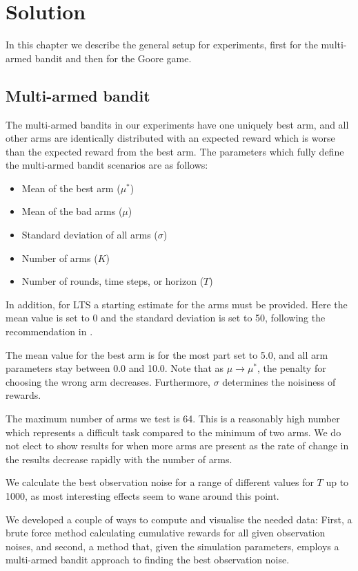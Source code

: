 \chapter{Solution}
\label{ch:solution}

In this chapter we describe the general setup for experiments, first for the multi-armed bandit and then for the Goore game.

\section{Multi-armed bandit}
The multi-armed bandits in our experiments have one uniquely best arm, and all other arms are identically distributed with an expected reward which is worse than the expected reward from the best arm.
The parameters which fully define the multi-armed bandit scenarios are as follows:
\begin{itemize}
    \item Mean of the best arm ($\mu^*$)
    \item Mean of the bad arms ($\mu$)
    \item Standard deviation of all arms ($\sigma$)
    \item Number of arms ($K$)
    \item Number of rounds, time steps, or horizon ($T$)
\end{itemize}

In addition, for LTS a starting estimate for the arms must be provided.
Here the mean value is set to 0 and the standard deviation is set to 50, following the recommendation in \cite{Glimsdal12}.

The mean value for the best arm is for the most part set to 5.0, and all arm parameters stay between 0.0 and 10.0.
Note that as $\mu \to \mu^*$, the penalty for choosing the wrong arm decreases.
Furthermore, $\sigma$ determines the noisiness of rewards.

The maximum number of arms we test is 64.
This is a reasonably high number which represents a difficult task compared to the minimum of two arms.
We do not elect to show results for when more arms are present as the rate of change in the results decrease rapidly with the number of arms.

We calculate the best observation noise for a range of different values for $T$ up to 1000, as most interesting effects seem to wane around this point.

We developed a couple of ways to compute and visualise the needed data:
First, a brute force method calculating cumulative rewards for all given observation noises, and second, a method that, given the simulation parameters, employs a multi-armed bandit approach to finding the best observation noise.

